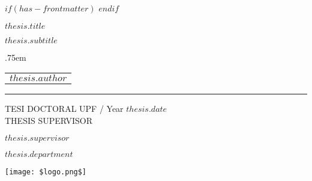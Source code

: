 $if(has-frontmatter)$
\frontmatter
$endif$


\begin{titlepage}
  \begin{spacing}{1}
    \null\vfil
    \begin{flushleft}%
      {\LARGE \sffamily $thesis.title$ \par}%
      \vspace*{2cm}
      {\Large \sffamily $thesis.subtitle$ \par}%
      \vskip 1cm%
      {\large \lineskip .75em \begin{tabular}[t]{c} {\Huge $thesis.author$} \end{tabular}\par}
      \rule{\linewidth}{1mm} \par
      \vskip 1cm%
      {\large TESI DOCTORAL UPF / Year $thesis.date$}\\[2cm]
      {\normalsize THESIS SUPERVISOR}\par
      {\large $thesis.supervisor$}\par
      {\large $thesis.department$} \par
      \vspace{2cm}
     \centering
      \texttt{[image: \$logo.png\$]}
     \end{flushleft}\par
     \afterpage{\blankpage}
    \end{spacing}
\end{titlepage}
\newpage


